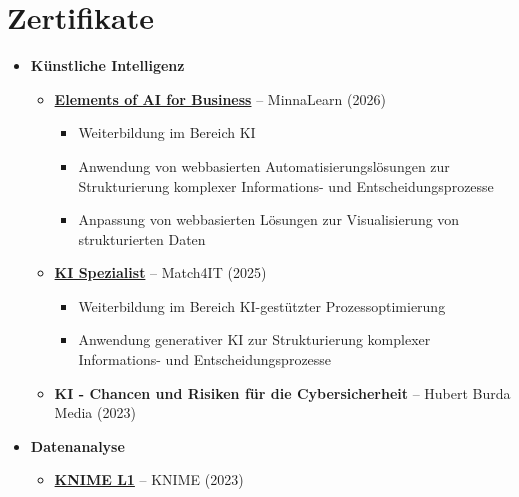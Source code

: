 \documentclass[a4paper,10pt]{article}
\begin{document}
\section*{Zertifikate}
\begin{itemize}

    \item[\faRobot] \textbf{Künstliche Intelligenz} \label{ai} 
    \begin{itemize}
        \item \textbf{\href{https://courses.minnalearn.com/certificate/en/elements-of-ai-for-business/221bff01-5c58-4c08-8d53-49a25e5e9b84}{Elements of AI for Business}} – MinnaLearn (2026)
        \begin{itemize}
            \item Weiterbildung im Bereich KI
            \item Anwendung von webbasierten Automatisierungslösungen zur Strukturierung komplexer Informations- und Entscheidungsprozesse
            \item Anpassung von webbasierten Lösungen zur Visualisierung von strukturierten Daten
        \end{itemize}
        \item \textbf{\href{https://match4it.com}{KI Spezialist}} – Match4IT (2025)
        \begin{itemize}
            \item Weiterbildung im Bereich KI-gestützter Prozessoptimierung 
            \item Anwendung generativer KI zur Strukturierung komplexer Informations- und Entscheidungsprozesse
        \end{itemize}
        \item \textbf{KI - Chancen und Risiken für die Cybersicherheit} – Hubert Burda Media (2023)
    \end{itemize}

    \item[\faChartBar] \textbf{Datenanalyse} \label{analytics} 
    \begin{itemize}

        \item[\faChartPie] \textbf{\href{https://www.credly.com/badges/891bf1ee-0b27-4b8d-945a-1a1587e1d36b/public_url}{KNIME L1}} – KNIME (2023)


\end{itemize}
\end{itemize}
\end{document}
